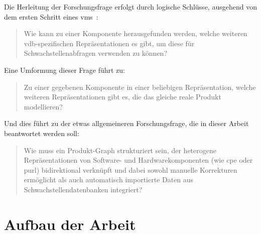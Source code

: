 \medskip

Die Herleitung der Forschungsfrage erfolgt durch logische Schlüsse, ausgehend von dem ersten Schritt eines \acrshort{vms}\ \autocite{Idrissi_Sebai_Faroukhi_Mahouachi_2024}:

\begin{quote}
    Wie kann zu einer Komponente herausgefunden werden, welche weiteren \acrshort{vdb}-spezifischen Repräsentationen es gibt, um diese für Schwachstellenabfragen verwenden zu können?
\end{quote}

Eine Umformung dieser Frage führt zu:

\begin{quote}
    Zu einer gegebenen Komponente in einer beliebigen Repräsentation, welche weiteren Repräsentationen gibt es, die das gleiche reale Produkt modellieren?
\end{quote}

Und dies führt zu der etwas allgemeineren Forschungsfrage, die in dieser Arbeit beantwortet werden soll:

\begin{quote}
    Wie muss ein Produkt-Graph strukturiert sein, der heterogene Repräsentationen von Software- und Hardwarekomponenten (wie \acrshort{cpe} oder \acrshort{purl}) bidirektional verknüpft und
    dabei sowohl manuelle Korrekturen ermöglicht als auch automatisch importierte Daten aus Schwachstellendatenbanken integriert?
\end{quote}


\section{Aufbau der Arbeit}\label{sec:arbeit-aufbau}
